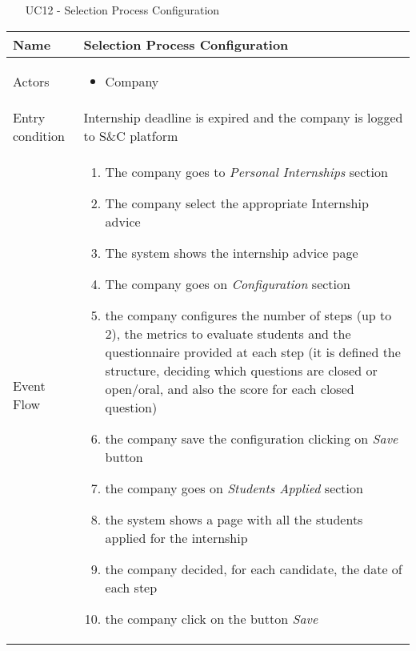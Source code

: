 				
				\begin{table} [H]
					\centering
					\begin{itemize}
						\item [UC12] - Selection Process Configuration
					\end{itemize}
					\begin{tabular}{|| P{7.5cm} | P{7.5cm} ||}
						\hline
						Name & Selection Process Configuration \\
						\hline
						Actors & \parbox{5cm}{\begin{itemize}
								\item Company
							\end{itemize}
						} \\
						\hline
						Entry condition & Internship deadline is expired and the 
						company is logged to S\&C platform  \\
						\hline
						Event Flow & \parbox{5cm}{\begin{enumerate}[label=\alpha]
								\item The company goes to \textit{Personal 
								Internships} section
								\item The company select the 
								appropriate Internship advice  
								\item The system shows the internship 
								advice page
								\item  The company goes on 
								\textit{Configuration} section
								\item  the company configures the 
								number of steps (up to 2), the 
								metrics to evaluate students and 
								the questionnaire provided at 
								each step (it is defined the structure, deciding which questions are closed or open/oral, and also the score for each closed question)
								\item the company save the 
								configuration clicking on \textit{Save}
								button 
								\item the company goes on \textit{Students 
								Applied} section
								\item the system shows a page with all 
								the students applied for the 
								internship 
								\item the company decided, for each 
								candidate, the date of each step
								\item the company click on the button 
								\textit{Save}
						\end{enumerate}} \\
						\hline 

\end{tabular}
\end{table}
